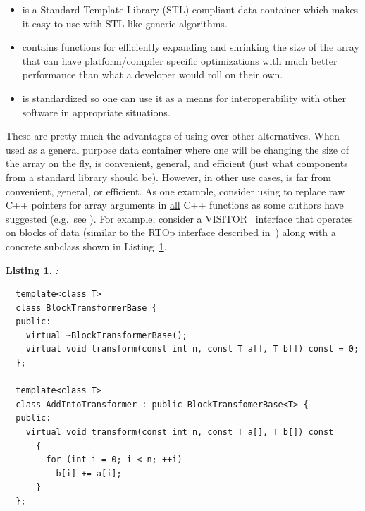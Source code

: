 \documentclass[pdf,ps2pdf,11pt]{SANDreport}
\newtheorem{listing}{Listing}
\begin{document}
\begin{itemize}

{}\item{} is a Standard Template Library (STL)
compliant data container which makes it easy to use with STL-like
generic algorithms.

{}\item{} contains functions for efficiently expanding
and shrinking the size of the array that can have platform/compiler
specific optimizations with much better performance than what a
developer would roll on their own.

{}\item{} is standardized so one can use it as a means
for interoperability with other software in appropriate situations.

\end{itemize}

These are pretty much the advantages of using {} over
other alternatives.  When used as a general purpose data container
where one will be changing the size of the array on the fly,
{} is convenient, general, and efficient (just what
components from a standard library should be).  However, in other use
cases, {} is far from convenient, general, or
efficient.  As one example, consider using {} to
replace raw C++ pointers for array arguments in {}\underline{all} C++
functions as some authors have suggested (e.g.\ see
{}\cite{Modernizing-the-C++-Interface-to-MPI}).  For example, consider
a VISITOR~\cite{ref:design_patterns_1995} interface that operates on
blocks of data (similar to the RTOp interface described
in~\cite{ref:rtop_toms}) along with a concrete subclass shown in
Listing~\ref{listing:addArrayIntoArray-raw}.

\begin{listing}:\\
\label{listing:addArrayIntoArray-raw}
{\small\begin{verbatim}
  template<class T>
  class BlockTransformerBase {
  public:
    virtual ~BlockTransformerBase();
    virtual void transform(const int n, const T a[], T b[]) const = 0;
  };

  template<class T>
  class AddIntoTransformer : public BlockTransfomerBase<T> {
  public:
    virtual void transform(const int n, const T a[], T b[]) const
      {
        for (int i = 0; i < n; ++i)
          b[i] += a[i];
      }
  };
\end{verbatim}}
\end{listing}
\end{document}
